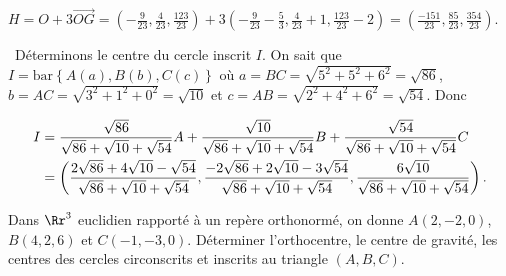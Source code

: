 {{\begin{center}
$H=O+3\overrightarrow{OG}=\left(-\frac{9}{23},\frac{4}{23},\frac{123}{23}\right)+3\left(-\frac{9}{23}-\frac{5}{3},\frac{4}{23}+1,\frac{123}{23}-2\right)=\left(\frac{-151}{23},\frac{85}{23},\frac{354}{23}\right)$.
\end{center}
\textbullet~Déterminons le centre du cercle inscrit $I$. On sait que $I=\text{bar}\left\{A(a),B(b),C(c)\right\}$ où $a=BC=\sqrt{5^2+5^2+6^2}=\sqrt{86}$, $b=AC=\sqrt{3^2+1^2+0^2}=\sqrt{10}$ et $c=AB=\sqrt{2^2+4^2+6^2}=\sqrt{54}$. Donc

\begin{align*}\ensuremath
I&=\frac{\sqrt{86}}{\sqrt{86}+\sqrt{10}+\sqrt{54}}A
+\frac{\sqrt{10}}{\sqrt{86}+\sqrt{10}+\sqrt{54}}B+\frac{\sqrt{54}}{\sqrt{86}+\sqrt{10}+\sqrt{54}}C\\
 &=\left(
 \frac{2\sqrt{86}+4\sqrt{10}-\sqrt{54}}{\sqrt{86}+\sqrt{10}+\sqrt{54}},
 \frac{-2\sqrt{86}+2\sqrt{10}-3\sqrt{54}}{\sqrt{86}+\sqrt{10}+\sqrt{54}},
 \frac{6\sqrt{10}}{\sqrt{86}+\sqrt{10}+\sqrt{54}}
 \right).
\end{align*}

Dans $\Rr^3$ euclidien rapporté à un repère orthonormé, on donne $A(2,-2,0)$, $B(4,2,6)$ et 
$C(-1,-3,0)$. Déterminer l'orthocentre, le centre de gravité, les centres des cercles circonscrits et inscrits au triangle $(A,B,C)$.
\begin{center}
\end{center}
}
}
